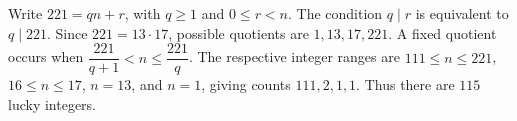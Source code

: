 Write $221=qn+r$, with $q\ge1$ and $0\le r<n$. The condition $q\mid r$ is equivalent to $q\mid221$. Since $221=13\cdot17$, possible quotients are $1,13,17,221$. A fixed quotient occurs when $\dfrac{221}{q+1}<n\le\dfrac{221}{q}$. The respective integer ranges are $111\le n\le221$, $16\le n\le17$, $n=13$, and $n=1$, giving counts $111,2,1,1$. Thus there are $\boxed{115}$ lucky integers.
